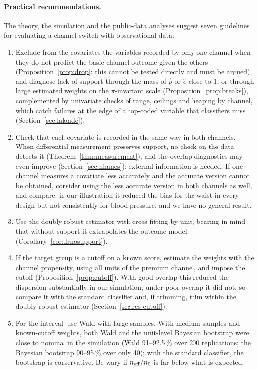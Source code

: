 \paragraph{Practical recommendations.} The theory, the simulation and the public-data analyses suggest seven guidelines for evaluating a channel switch with observational data:
\begin{enumerate}
  \item Exclude from the covariates the variables recorded by only one channel when they do not predict the basic-channel outcome given the others (Proposition~\ref{prop:drop}; this cannot be tested directly and must be argued), and diagnose lack of support through the mass of $\hat p$ or $\hat e$ close to 1, or through large estimated weights on the $\pi$-invariant scale (Proposition~\ref{prop:breaks}), complemented by univariate checks of range, ceilings and heaping by channel, which catch failures at the edge of a top-coded variable that classifiers miss (Section~\ref{sec:lalonde}).
  \item Check that each covariate is recorded in the same way in both channels. When differential measurement preserves support, no check on the data detects it (Theorem~\ref{thm:measurement}), and the overlap diagnostics may even improve (Section~\ref{sec:nhanes}); external information is needed. If one channel measures a covariate less accurately and the accurate version cannot be obtained, consider using the less accurate version in both channels as well, and compare: in our illustration it reduced the bias for the waist in every design but not consistently for blood pressure, and we have no general result.
  \item Use the doubly robust estimator with cross-fitting by unit, bearing in mind that without support it extrapolates the outcome model (Corollary~\ref{cor:drnosupport}).
  \item If the target group is a cutoff on a known score, estimate the weights with the channel propensity, using all units of the premium channel, and impose the cutoff (Proposition~\ref{prop:cutoff}). With good overlap this reduced the dispersion substantially in our simulation; under poor overlap it did not, so compare it with the standard classifier and, if trimming, trim within the doubly robust estimator (Section~\ref{sec:res-cutoff}).
  \item For the interval, use Wald with large samples. With medium samples and known-cutoff weights, both Wald and the unit-level Bayesian bootstrap were close to nominal in the simulation (Wald 91--92.5\,\% over 200 replications; the Bayesian bootstrap 90--95\,\% over only 40); with the standard classifier, the bootstrap is conservative. Be wary if $n_{\mathrm{eff}}/n_0$ is far below what is expected.

\end{enumerate}
